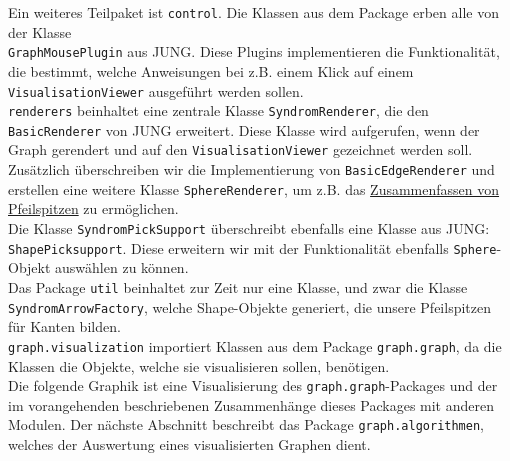 \documentclass[enabledeprecatedfontcommands,fontsize=11pt,paper=a4,twoside]{scrartcl}
\begin{document}
Ein weiteres Teilpaket ist \texttt{control}. Die Klassen aus dem Package erben alle von der Klasse \\ \texttt{GraphMousePlugin} aus JUNG. Diese Plugins implementieren die Funktionalität, die bestimmt, welche Anweisungen bei z.B. einem Klick auf einem \texttt{VisualisationViewer} ausgeführt werden sollen. \\

\texttt{renderers} beinhaltet eine zentrale Klasse \texttt{SyndromRenderer}, die den \texttt{BasicRenderer} von JUNG erweitert. Diese Klasse wird aufgerufen, wenn der Graph gerendert und auf den \texttt{VisualisationViewer} gezeichnet werden soll. Zusätzlich überschreiben wir die Implementierung von \texttt{BasicEdgeRenderer} und erstellen eine weitere Klasse \texttt{SphereRenderer}, um z.B. das \hyperlink{cc}{Zusammenfassen von Pfeilspitzen} zu ermöglichen. \\

Die Klasse \texttt{SyndromPickSupport} überschreibt ebenfalls eine Klasse aus JUNG: \texttt{ShapePicksupport}. Diese erweitern wir mit der Funktionalität ebenfalls \texttt{Sphere}-Objekt auswählen zu können. \\ 

Das Package \texttt{util} beinhaltet zur Zeit nur eine Klasse, und zwar die Klasse \texttt{SyndromArrowFactory}, welche Shape-Objekte generiert, die unsere Pfeilspitzen für Kanten bilden. \\

\texttt{graph.visualization} importiert Klassen aus dem Package \texttt{graph.graph}, da die Klassen die Objekte, welche sie visualisieren sollen, benötigen. \\

Die folgende Graphik ist eine Visualisierung des \texttt{graph.graph}-Packages und der im vorangehenden beschriebenen Zusammenhänge dieses Packages mit anderen Modulen. Der nächste Abschnitt beschreibt das Package \texttt{graph.algorithmen}, welches der Auswertung eines visualisierten Graphen dient.


\end{document}
